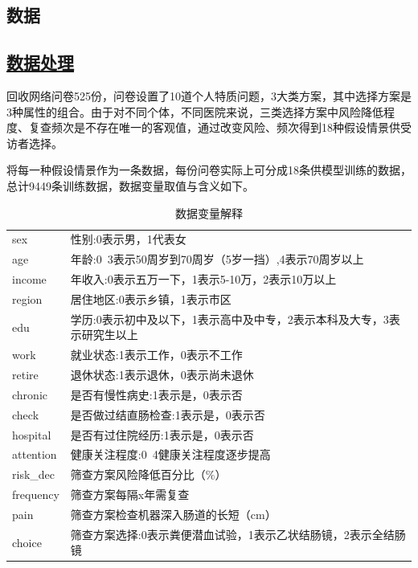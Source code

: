 \documentclass[10pt, conference, compsocconf]{IEEEtran}
\begin{document}
\begin{CJK}{UTF8}{gbsn}

\section{数据}
\vspace{0.5cm}
\subsection{\underline{数据处理}}
回收网络问卷525份，问卷设置了10道个人特质问题，3大类方案，其中选择方案是3种属性的组合。由于对不同个体，不同医院来说，三类选择方案中风险降低程度、复查频次是不存在唯一的客观值，通过改变风险、频次得到18种假设情景供受访者选择。

将每一种假设情景作为一条数据，每份问卷实际上可分成18条供模型训练的数据，总计9449条训练数据，数据变量取值与含义如下。
\begin{table}[h]
\caption{数据变量解释}\label{Table 2}
\centering
\begin{tabular}{p{1cm}p{7cm}}
\hline
sex & 性别:0表示男，1代表女 \\
age & 年龄:0~3表示50周岁到70周岁（5岁一挡）,4表示70周岁以上\\
income & 年收入:0表示五万一下，1表示5-10万，2表示10万以上\\
region & 居住地区:0表示乡镇，1表示市区\\
edu & 学历:0表示初中及以下，1表示高中及中专，2表示本科及大专，3表示研究生以上\\
work & 就业状态:1表示工作，0表示不工作\\
retire & 退休状态:1表示退休，0表示尚未退休\\
chronic & 是否有慢性病史:1表示是，0表示否\\
check & 是否做过结直肠检查:1表示是，0表示否\\
hospital & 是否有过住院经历:1表示是，0表示否\\
attention & 健康关注程度:0~4健康关注程度逐步提高\\
risk\_dec & 筛查方案风险降低百分比（\%）\\
frequency & 筛查方案每隔x年需复查\\
pain & 筛查方案检查机器深入肠道的长短（cm）\\
choice & 筛查方案选择:0表示粪便潜血试验，1表示乙状结肠镜，2表示全结肠镜\\
\hline
\end{tabular}
\end{table}


\end{CJK}
\end{document}

